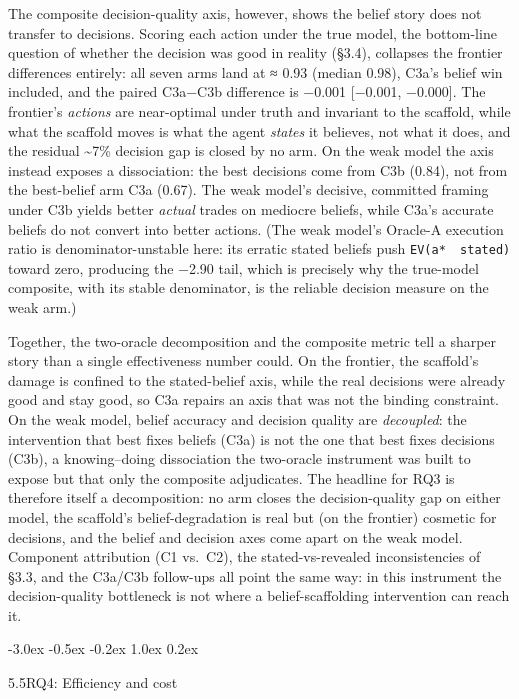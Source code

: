 \documentclass[
  11pt,
]{article}
\makeatletter
\renewcommand{\subsection}{%
  \@startsection{subsection}{2}{\z@}%
                {-3.0ex \@plus -0.5ex \@minus -0.2ex}%
                { 1.0ex \@plus  0.2ex}%
                {\normalsize\bf\raggedright}%
}
\makeatother
\begin{document}
The composite decision-quality axis, however, shows the belief story does not transfer to decisions. Scoring each action under the true model, the bottom-line question of whether the decision was good in reality (§3.4), collapses the frontier differences entirely: all seven arms land at ≈ 0.93 (median 0.98), C3a's belief win included, and the paired C3a−C3b difference is −0.001 {[}−0.001, −0.000{]}. The frontier's \emph{actions} are near-optimal under truth and invariant to the scaffold, while what the scaffold moves is what the agent \emph{states} it believes, not what it does, and the residual \textasciitilde7\% decision gap is closed by no arm. On the weak model the axis instead exposes a dissociation: the best decisions come from C3b (0.84), not from the best-belief arm C3a (0.67). The weak model's decisive, committed framing under C3b yields better \emph{actual} trades on mediocre beliefs, while C3a's accurate beliefs do not convert into better actions. (The weak model's Oracle-A execution ratio is denominator-unstable here: its erratic stated beliefs push \texttt{EV(a*\ \textbar{}\ stated)} toward zero, producing the −2.90 tail, which is precisely why the true-model composite, with its stable denominator, is the reliable decision measure on the weak arm.)

Together, the two-oracle decomposition and the composite metric tell a sharper story than a single effectiveness number could. On the frontier, the scaffold's damage is confined to the stated-belief axis, while the real decisions were already good and stay good, so C3a repairs an axis that was not the binding constraint. On the weak model, belief accuracy and decision quality are \emph{decoupled}: the intervention that best fixes beliefs (C3a) is not the one that best fixes decisions (C3b), a knowing--doing dissociation the two-oracle instrument was built to expose but that only the composite adjudicates. The headline for RQ3 is therefore itself a decomposition: no arm closes the decision-quality gap on either model, the scaffold's belief-degradation is real but (on the frontier) cosmetic for decisions, and the belief and decision axes come apart on the weak model. Component attribution (C1 vs.~C2), the stated-vs-revealed inconsistencies of §3.3, and the C3a/C3b follow-ups all point the same way: in this instrument the decision-quality bottleneck is not where a belief-scaffolding intervention can reach it.

\clearpage

\subsection{5.5\quad RQ4: Efficiency and cost}\label{rq4-efficiency-and-cost}
\end{document}
